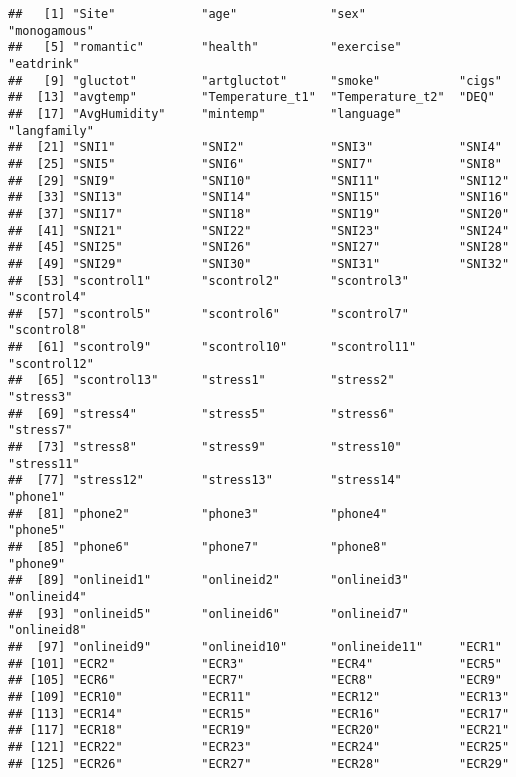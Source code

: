 \documentclass[
]{article}
\begin{document}
\begin{verbatim}
##   [1] "Site"            "age"             "sex"             "monogamous"     
##   [5] "romantic"        "health"          "exercise"        "eatdrink"       
##   [9] "gluctot"         "artgluctot"      "smoke"           "cigs"           
##  [13] "avgtemp"         "Temperature_t1"  "Temperature_t2"  "DEQ"            
##  [17] "AvgHumidity"     "mintemp"         "language"        "langfamily"     
##  [21] "SNI1"            "SNI2"            "SNI3"            "SNI4"           
##  [25] "SNI5"            "SNI6"            "SNI7"            "SNI8"           
##  [29] "SNI9"            "SNI10"           "SNI11"           "SNI12"          
##  [33] "SNI13"           "SNI14"           "SNI15"           "SNI16"          
##  [37] "SNI17"           "SNI18"           "SNI19"           "SNI20"          
##  [41] "SNI21"           "SNI22"           "SNI23"           "SNI24"          
##  [45] "SNI25"           "SNI26"           "SNI27"           "SNI28"          
##  [49] "SNI29"           "SNI30"           "SNI31"           "SNI32"          
##  [53] "scontrol1"       "scontrol2"       "scontrol3"       "scontrol4"      
##  [57] "scontrol5"       "scontrol6"       "scontrol7"       "scontrol8"      
##  [61] "scontrol9"       "scontrol10"      "scontrol11"      "scontrol12"     
##  [65] "scontrol13"      "stress1"         "stress2"         "stress3"        
##  [69] "stress4"         "stress5"         "stress6"         "stress7"        
##  [73] "stress8"         "stress9"         "stress10"        "stress11"       
##  [77] "stress12"        "stress13"        "stress14"        "phone1"         
##  [81] "phone2"          "phone3"          "phone4"          "phone5"         
##  [85] "phone6"          "phone7"          "phone8"          "phone9"         
##  [89] "onlineid1"       "onlineid2"       "onlineid3"       "onlineid4"      
##  [93] "onlineid5"       "onlineid6"       "onlineid7"       "onlineid8"      
##  [97] "onlineid9"       "onlineid10"      "onlineide11"     "ECR1"           
## [101] "ECR2"            "ECR3"            "ECR4"            "ECR5"           
## [105] "ECR6"            "ECR7"            "ECR8"            "ECR9"           
## [109] "ECR10"           "ECR11"           "ECR12"           "ECR13"          
## [113] "ECR14"           "ECR15"           "ECR16"           "ECR17"          
## [117] "ECR18"           "ECR19"           "ECR20"           "ECR21"          
## [121] "ECR22"           "ECR23"           "ECR24"           "ECR25"          
## [125] "ECR26"           "ECR27"           "ECR28"           "ECR29"          

\end{verbatim}
\end{document}
